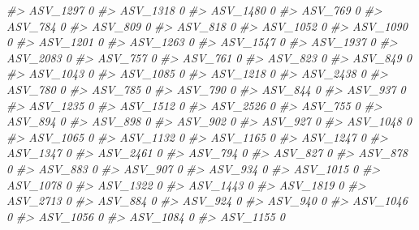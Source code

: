 \documentclass[
]{article}
\newenvironment{Shaded}{\begin{snugshade}}{\end{snugshade}}
\newcommand{\CommentTok}[1]{\textcolor[rgb]{0.56,0.35,0.01}{\textit{#1}}}
\begin{document}
\begin{Shaded}
\begin{Highlighting}[]
\CommentTok{\#\textgreater{} ASV\_1297  0}
\CommentTok{\#\textgreater{} ASV\_1318  0}
\CommentTok{\#\textgreater{} ASV\_1480  0}
\CommentTok{\#\textgreater{} ASV\_769   0}
\CommentTok{\#\textgreater{} ASV\_784   0}
\CommentTok{\#\textgreater{} ASV\_809   0}
\CommentTok{\#\textgreater{} ASV\_818   0}
\CommentTok{\#\textgreater{} ASV\_1052  0}
\CommentTok{\#\textgreater{} ASV\_1090  0}
\CommentTok{\#\textgreater{} ASV\_1201  0}
\CommentTok{\#\textgreater{} ASV\_1263  0}
\CommentTok{\#\textgreater{} ASV\_1547  0}
\CommentTok{\#\textgreater{} ASV\_1937  0}
\CommentTok{\#\textgreater{} ASV\_2083  0}
\CommentTok{\#\textgreater{} ASV\_757   0}
\CommentTok{\#\textgreater{} ASV\_761   0}
\CommentTok{\#\textgreater{} ASV\_823   0}
\CommentTok{\#\textgreater{} ASV\_849   0}
\CommentTok{\#\textgreater{} ASV\_1043  0}
\CommentTok{\#\textgreater{} ASV\_1085  0}
\CommentTok{\#\textgreater{} ASV\_1218  0}
\CommentTok{\#\textgreater{} ASV\_2438  0}
\CommentTok{\#\textgreater{} ASV\_780   0}
\CommentTok{\#\textgreater{} ASV\_785   0}
\CommentTok{\#\textgreater{} ASV\_790   0}
\CommentTok{\#\textgreater{} ASV\_844   0}
\CommentTok{\#\textgreater{} ASV\_937   0}
\CommentTok{\#\textgreater{} ASV\_1235  0}
\CommentTok{\#\textgreater{} ASV\_1512  0}
\CommentTok{\#\textgreater{} ASV\_2526  0}
\CommentTok{\#\textgreater{} ASV\_755   0}
\CommentTok{\#\textgreater{} ASV\_894   0}
\CommentTok{\#\textgreater{} ASV\_898   0}
\CommentTok{\#\textgreater{} ASV\_902   0}
\CommentTok{\#\textgreater{} ASV\_927   0}
\CommentTok{\#\textgreater{} ASV\_1048  0}
\CommentTok{\#\textgreater{} ASV\_1065  0}
\CommentTok{\#\textgreater{} ASV\_1132  0}
\CommentTok{\#\textgreater{} ASV\_1165  0}
\CommentTok{\#\textgreater{} ASV\_1247  0}
\CommentTok{\#\textgreater{} ASV\_1347  0}
\CommentTok{\#\textgreater{} ASV\_2461  0}
\CommentTok{\#\textgreater{} ASV\_794   0}
\CommentTok{\#\textgreater{} ASV\_827   0}
\CommentTok{\#\textgreater{} ASV\_878   0}
\CommentTok{\#\textgreater{} ASV\_883   0}
\CommentTok{\#\textgreater{} ASV\_907   0}
\CommentTok{\#\textgreater{} ASV\_934   0}
\CommentTok{\#\textgreater{} ASV\_1015  0}
\CommentTok{\#\textgreater{} ASV\_1078  0}
\CommentTok{\#\textgreater{} ASV\_1322  0}
\CommentTok{\#\textgreater{} ASV\_1443  0}
\CommentTok{\#\textgreater{} ASV\_1819  0}
\CommentTok{\#\textgreater{} ASV\_2713  0}
\CommentTok{\#\textgreater{} ASV\_884   0}
\CommentTok{\#\textgreater{} ASV\_924   0}
\CommentTok{\#\textgreater{} ASV\_940   0}
\CommentTok{\#\textgreater{} ASV\_1046  0}
\CommentTok{\#\textgreater{} ASV\_1056  0}
\CommentTok{\#\textgreater{} ASV\_1084  0}
\CommentTok{\#\textgreater{} ASV\_1155  0}

\end{Highlighting}
\end{Shaded}
\end{document}

